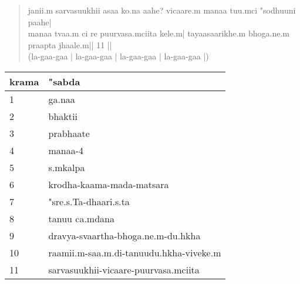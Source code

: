 \documentclass[a6paper]{article}
\begin{document}
    \begin{verse}
        janii.m sarvasuukhii asaa ko.na aahe?
        vicaare.m manaa tuu.mci "sodhuuni paahe|\\

        manaa tvaa.m ci re puurvasa.mciita kele.m|
        tayaasaarikhe.m bhoga.ne.m praapta jhaale.m|| 11 ||\\
        (la-gaa-gaa | la-gaa-gaa | la-gaa-gaa | la-gaa-gaa |)
    \end{verse}

\begin{tabular}{|l|l|}
\hline
krama & "sabda\\
\hline
1 & ga.naa \\
\hline
2 & bhaktii \\
\hline
3 & prabhaate \\
\hline
4 & manaa-4 \\
\hline
5 & s.mkalpa \\
\hline
6 & krodha-kaama-mada-matsara \\
\hline
7 & "sre.s.Ta-dhaari.s.ta \\
\hline
8 & tanuu ca.mdana\\
\hline
9 & dravya-svaartha-bhoga.ne.m-du.hkha\\
\hline
10 & raamii.m-saa.m.di-tanuudu.hkha-viveke.m\\
\hline
11 & sarvasuukhii-vicaare-puurvasa.mciita\\
\hline
\end{tabular}
        
\end{document}
